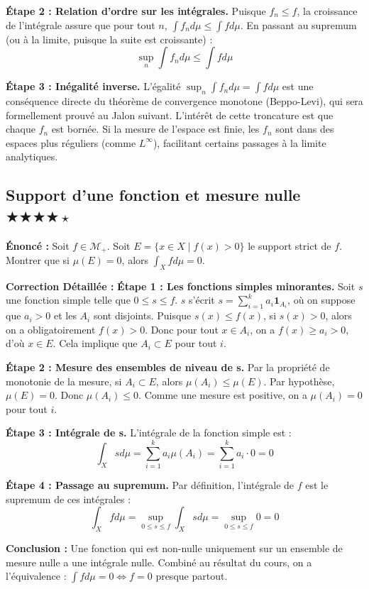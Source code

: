 \documentclass[11pt,a4paper]{article}
\begin{document}
\textbf{Étape 2 : Relation d'ordre sur les int\'egrales.}
Puisque $f_n \le f$, la croissance de l'int\'egrale assure que pour tout $n$, $\int f_n d\mu \le \int f d\mu$.
En passant au supremum (ou \`a la limite, puisque la suite est croissante) :
$$\sup_n \int f_n d\mu \le \int f d\mu$$

\textbf{Étape 3 : In\'egalit\'e inverse.}
L'\'egalit\'e $\sup_n \int f_n d\mu = \int f d\mu$ est une cons\'equence directe du th\'eor\`eme de convergence monotone (Beppo-Levi), qui sera formellement prouv\'e au Jalon suivant.
L'int\'er\^et de cette troncature est que chaque $f_n$ est born\'ee. Si la mesure de l'espace est finie, les $f_n$ sont dans des espaces plus r\'eguliers (comme $L^\infty$), facilitant certains passages \`a la limite analytiques.


\subsection*{Support d'une fonction et mesure nulle \quad $\bigstar\bigstar\bigstar\bigstar\star$}

\textbf{Énonc\'e :}
Soit $f \in \mathcal{M}_+$. Soit $E = \{x \in X \mid f(x) > 0\}$ le support strict de $f$.
Montrer que si $\mu(E) = 0$, alors $\int_X f d\mu = 0$.

\textbf{Correction D\'etaill\'ee :}
\textbf{Étape 1 : Les fonctions simples minorantes.}
Soit $s$ une fonction simple telle que $0 \le s \le f$.
$s$ s'\'ecrit $s = \sum_{i=1}^k a_i \mathbf{1}_{A_i}$, où on suppose que $a_i > 0$ et les $A_i$ sont disjoints.
Puisque $s(x) \le f(x)$, si $s(x) > 0$, alors on a obligatoirement $f(x) > 0$.
Donc pour tout $x \in A_i$, on a $f(x) \ge a_i > 0$, d'où $x \in E$.
Cela implique que $A_i \subset E$ pour tout $i$.

\textbf{Étape 2 : Mesure des ensembles de niveau de s.}
Par la propri\'et\'e de monotonie de la mesure, si $A_i \subset E$, alors $\mu(A_i) \le \mu(E)$.
Par hypoth\`ese, $\mu(E) = 0$. Donc $\mu(A_i) \le 0$.
Comme une mesure est positive, on a $\mu(A_i) = 0$ pour tout $i$.

\textbf{Étape 3 : Int\'egrale de s.}
L'int\'egrale de la fonction simple est :
$$\int_X s d\mu = \sum_{i=1}^k a_i \mu(A_i) = \sum_{i=1}^k a_i \cdot 0 = 0$$

\textbf{Étape 4 : Passage au supremum.}
Par d\'efinition, l'int\'egrale de $f$ est le supremum de ces int\'egrales :
$$\int_X f d\mu = \sup_{0 \le s \le f} \int_X s d\mu = \sup_{0 \le s \le f} 0 = 0$$

\textbf{Conclusion :}
Une fonction qui est non-nulle uniquement sur un ensemble de mesure nulle a une int\'egrale nulle. Combin\'e au r\'esultat du cours, on a l'\'equivalence : $\int f d\mu = 0 \iff f = 0$ presque partout.
\end{document}
